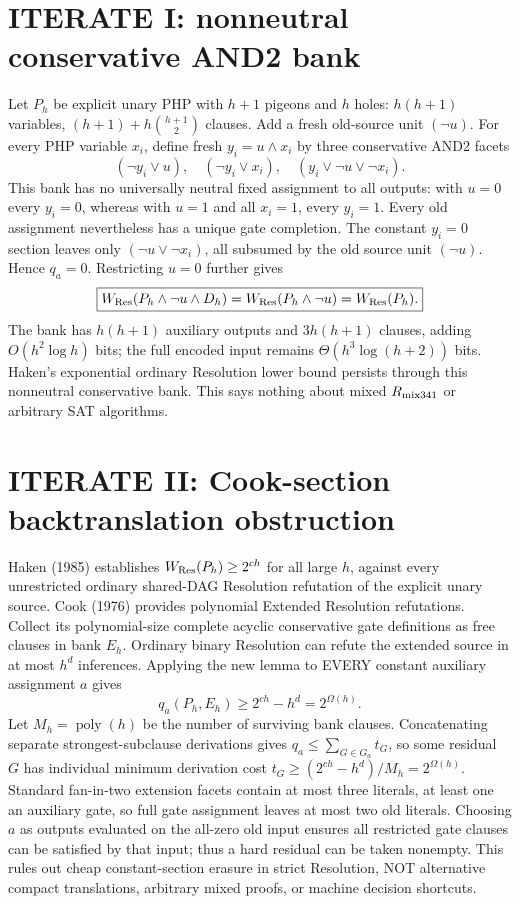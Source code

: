 \documentclass{article}
\begin{document}
\section*{ITERATE I: nonneutral conservative AND2 bank}
Let $P_h$ be explicit unary PHP with $h+1$ pigeons and $h$ holes: $h(h+1)$ variables, $(h+1)+h\binom{h+1}{2}$ clauses. Add a fresh old-source unit $(\neg u)$. For every PHP variable $x_i$, define fresh $y_i=u\land x_i$ by three conservative AND2 facets
\[
(\neg y_i\lor u),\quad(\neg y_i\lor x_i),\quad(y_i\lor\neg u\lor\neg x_i).
\]
This bank has no universally neutral fixed assignment to all outputs: with $u=0$ every $y_i=0$, whereas with $u=1$ and all $x_i=1$, every $y_i=1$. Every old assignment nevertheless has a unique gate completion. The constant $y_i=0$ section leaves only $(\neg u\lor\neg x_i)$, all subsumed by the old source unit $(\neg u)$. Hence $q_a=0$. Restricting $u=0$ further gives
\[
\boxed{W_{\rm Res}(P_h\land\neg u\land D_h)
=W_{\rm Res}(P_h\land\neg u)=W_{\rm Res}(P_h).}
\]
The bank has $h(h+1)$ auxiliary outputs and $3h(h+1)$ clauses, adding $O(h^2\log h)$ bits; the full encoded input remains $\Theta(h^3\log(h+2))$ bits. Haken's exponential ordinary Resolution lower bound persists through this nonneutral conservative bank. This says nothing about mixed $R_{\rm mix341}$ or arbitrary SAT algorithms.
\section*{ITERATE II: Cook-section backtranslation obstruction}
Haken (1985) establishes $W_{\rm Res}(P_h)\ge2^{ch}$ for all large $h$, against every unrestricted ordinary shared-DAG Resolution refutation of the explicit unary source. Cook (1976) provides polynomial Extended Resolution refutations. Collect its polynomial-size complete acyclic conservative gate definitions as free clauses in bank $E_h$. Ordinary binary Resolution can refute the extended source in at most $h^d$ inferences. Applying the new lemma to EVERY constant auxiliary assignment $a$ gives
\[
\boxed{q_a(P_h,E_h)\ge2^{ch}-h^d=2^{\Omega(h)}.}
\]
Let $M_h=\operatorname{poly}(h)$ be the number of surviving bank clauses. Concatenating separate strongest-subclause derivations gives $q_a\le\sum_{G\in G_a} t_G$, so some residual $G$ has individual minimum derivation cost $t_G\ge(2^{ch}-h^d)/M_h=2^{\Omega(h)}$. Standard fan-in-two extension facets contain at most three literals, at least one an auxiliary gate, so full gate assignment leaves at most two old literals. Choosing $a$ as outputs evaluated on the all-zero old input ensures all restricted gate clauses can be satisfied by that input; thus a hard residual can be taken nonempty. This rules out cheap constant-section erasure in strict Resolution, NOT alternative compact translations, arbitrary mixed proofs, or machine decision shortcuts.
\end{document}
